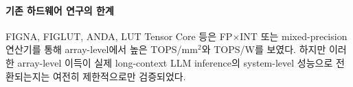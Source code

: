 \documentclass[11pt]{article}
\newcommand{\todo}[1]{\textcolor{red}{[TODO: #1]}}
\newcommand{\fpint}{FP$\times$INT}
\begin{document}
\paragraph{기존 하드웨어 연구의 한계}

FIGNA, FIGLUT, ANDA, LUT Tensor Core 등은 \fpint{} 또는 mixed-precision 연산기를 통해 array-level에서 높은 TOPS/mm$^2$와 TOPS/W를 보였다.
하지만 이러한 array-level 이득이 실제 long-context LLM inference의 system-level 성능으로 전환되는지는 여전히 제한적으로만 검증되었다.
\end{document}
